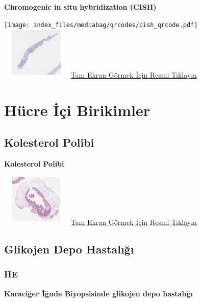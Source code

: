 \documentclass[
  letterpaper,
  DIV=11,
  numbers=noendperiod]{scrreprt}
\begin{document}
\textbf{Chromogenic in situ hybridization (CISH)}

\texttt{[image: index\_files/mediabag/qrcodes/cish\_qrcode.pdf]}
\href{https://images.patolojiatlasi.com/her2-cish/cish.html}{\includegraphics[width=0.25\textwidth,height=\textheight]{./screenshots/thumbnail_cish.png}}
\href{https://images.patolojiatlasi.com/her2-cish/cish.html}{Tam Ekran
Görmek İçin Resmi Tıklayın}

\hypertarget{sec-hucre-ici-birikimler}{%
\chapter{Hücre İçi Birikimler}\label{sec-hucre-ici-birikimler}}

\hypertarget{sec-kolesterol-polibi}{%
\section{Kolesterol Polibi}\label{sec-kolesterol-polibi}}

\textbf{Kolesterol Polibi}

\href{https://images.patolojiatlasi.com/cholesterolpolyp/HE.html}{\includegraphics[width=0.25\textwidth,height=\textheight]{./screenshots/thumbnail_cholesterolpolyp.png}}
\href{https://images.patolojiatlasi.com/cholesterolpolyp/HE.html}{Tam
Ekran Görmek İçin Resmi Tıklayın}

\hypertarget{sec-glikojen-depo-hastaligi}{%
\section{Glikojen Depo Hastalığı}\label{sec-glikojen-depo-hastaligi}}

\hypertarget{he}{%
\subsection{HE}\label{he}}

\textbf{Karaciğer İğnde Biyopsisinde glikojen depo hastalığı}
\end{document}
